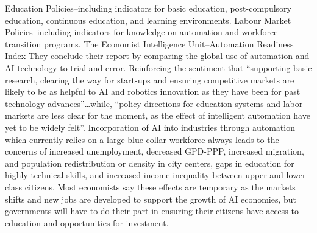 \documentclass[journal]{IEEEtran}
\begin{document}
Education Policies--including indicators for basic education, post-compulsory education, continuous education, and learning environments.
Labour Market Policies--including indicators for knowledge on automation and workforce transition programs.
The Economist Intelligence Unit--Automation Readiness Index
They conclude their report by comparing the global use of automation and AI technology to trial and error. Reinforcing the sentiment that “supporting basic research, clearing the way for start-ups and ensuring competitive markets are likely to be as helpful to AI and robotics innovation as they have been for past technology advances”…while, “policy directions for education systems and labor markets are less clear for the moment, as the effect of intelligent automation have yet to be widely felt”.
Incorporation of AI into industries through automation which currently relies on a large blue-collar workforce always leads to the concerns of increased unemployment, decreased GPD-PPP, increased migration, and population redistribution or density in city centers, gaps in education for highly technical skills, and increased income inequality between upper and lower class citizens. Most economists say these effects are temporary as the markets shifts and new jobs are developed to support the growth of AI economies, but governments will have to do their part in ensuring their citizens have access to education and opportunities for investment.
\end{document}
